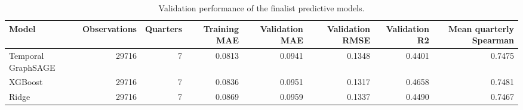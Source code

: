 \begin{table}
\caption{Validation performance of the finalist predictive models.}
\label{tab:selected-models-validation-comparison}
\begin{tabular}{lrrrrrrr}
\toprule
Model & Observations & Quarters & Training MAE & Validation MAE & Validation RMSE & Validation R2 & Mean quarterly Spearman \\
\midrule
Temporal GraphSAGE & 29716 & 7 & 0.0813 & 0.0941 & 0.1348 & 0.4401 & 0.7475 \\
XGBoost & 29716 & 7 & 0.0836 & 0.0951 & 0.1317 & 0.4658 & 0.7481 \\
Ridge & 29716 & 7 & 0.0869 & 0.0959 & 0.1337 & 0.4490 & 0.7467 \\
\bottomrule
\end{tabular}
\end{table}
